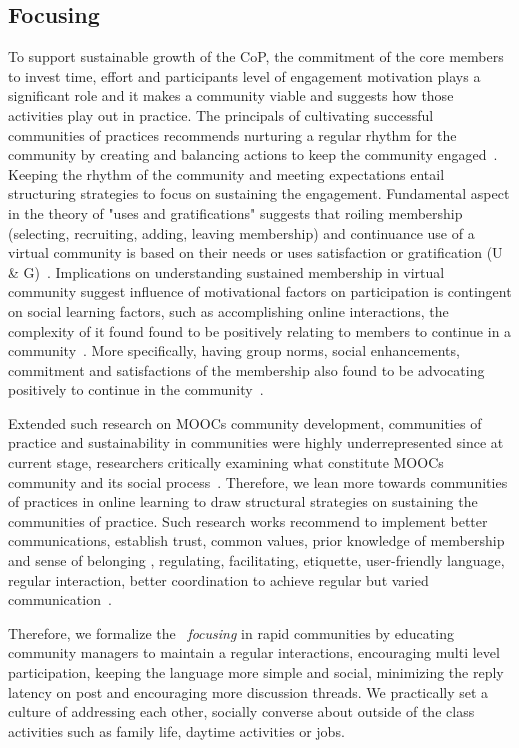 \documentclass[manuscript,screen,review]{acmart}
\begin{document}
\subsection{Focusing}
To support sustainable growth of the CoP, the commitment of the core members to invest time, effort and participants level of engagement motivation plays a significant role and it makes a community viable and suggests how those activities play out in practice. The principals of cultivating successful communities of practices recommends nurturing a regular rhythm for the community by creating and balancing actions to keep the community engaged~\cite{wenger2002seven}. Keeping the rhythm of the community and meeting expectations entail structuring strategies to focus on sustaining the engagement. Fundamental aspect in the theory of "uses and gratifications" suggests that roiling membership (selecting, recruiting, adding, leaving membership) and continuance use of a virtual community is based on their needs or uses satisfaction or gratification (U \& G)~\cite{sangwan2005virtual}. Implications on understanding sustained membership in virtual community suggest influence of motivational factors on participation is contingent on social learning factors, such as accomplishing online interactions, the complexity of it found found to be positively relating to members to continue in a community~\cite{sun2012understanding}. More specifically, having group norms, social enhancements, commitment and satisfactions of the membership also found to be advocating positively to continue in the community~\cite{cheung2009understanding}. 

Extended such research on MOOCs community development, communities of practice and sustainability in communities were highly underrepresented since at current stage, researchers critically examining  what constitute MOOCs community and its social process~\cite{oleksandra2016untangling,poquet2018social}. Therefore, we lean more towards communities of practices in online learning to draw structural strategies on sustaining the communities of practice. Such research works recommend to implement better communications, establish trust, common values, prior knowledge of membership and sense of belonging , regulating, facilitating, etiquette, user-friendly language, regular interaction, better coordination to achieve regular but varied communication~\cite{bradbury2015role,gannon2007communities}. 

Therefore, we formalize the ~\textit{focusing} in rapid communities by educating community managers to maintain a regular interactions, encouraging multi level participation, keeping the language more simple and social, minimizing the reply latency on post and encouraging more discussion threads. We practically set a culture of addressing each other, socially converse about outside of the class activities such as family life, daytime activities or jobs. 
\end{document}
